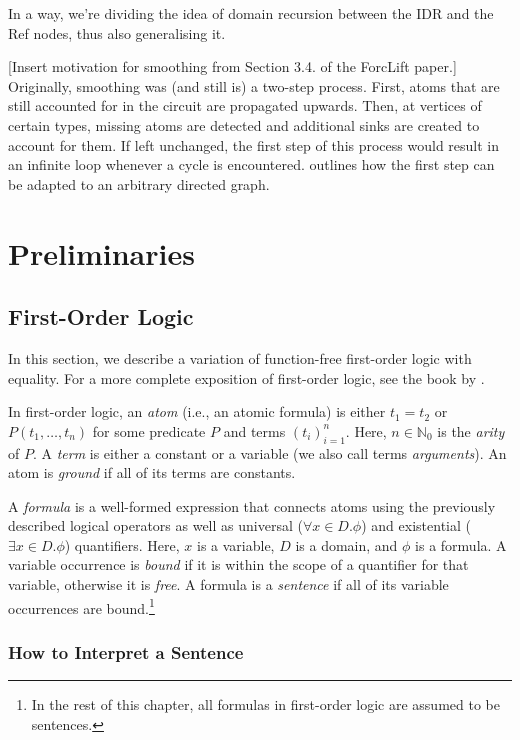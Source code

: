 In a way, we're dividing the idea of domain recursion between the IDR and the
Ref nodes, thus also generalising it.

[Insert motivation for smoothing from Section 3.4. of the ForcLift paper.]
Originally, smoothing was (and still is) a two-step process. First, atoms that
are still accounted for in the circuit are propagated upwards. Then, at vertices
of certain types, missing atoms are detected and additional sinks are created to
account for them. If left unchanged, the first step of this process would result
in an infinite loop whenever a cycle is encountered. 
outlines how the first step can be adapted to an arbitrary directed graph.

\section{Preliminaries}

\subsection{First-Order Logic}

In this section, we describe a variation of function-free first-order logic with
equality. For a more complete exposition of first-order logic, see the book by
\citet{DBLP:books/daglib/0023546}.

In first-order logic, an \emph{atom} (i.e., an atomic formula) is either
$t_1 = t_2$ or $P(t_1, \dots, t_n)$ for some predicate $P$ and terms
$(t_i)_{i=1}^n$. Here, $n \in \mathbb{N}_0$ is the \emph{arity} of $P$. A
\emph{term} is either a constant or a variable (we also call terms
\emph{arguments}). An atom is \emph{ground} if all of its terms are constants.

A \emph{formula} is a well-formed expression that connects atoms using the
previously described logical operators as well as universal
($\forall x \in D. \phi$) and existential ($\exists x \in D. \phi$) quantifiers.
Here, $x$ is a variable, $D$ is a domain, and $\phi$ is a formula. A variable
occurrence is \emph{bound} if it is within the scope of a quantifier for that
variable, otherwise it is \emph{free}. A formula is a \emph{sentence} if all of
its variable occurrences are bound.\footnote{In the rest of this chapter, all
  formulas in first-order logic are assumed to be sentences.}

\subsubsection{How to Interpret a Sentence}

